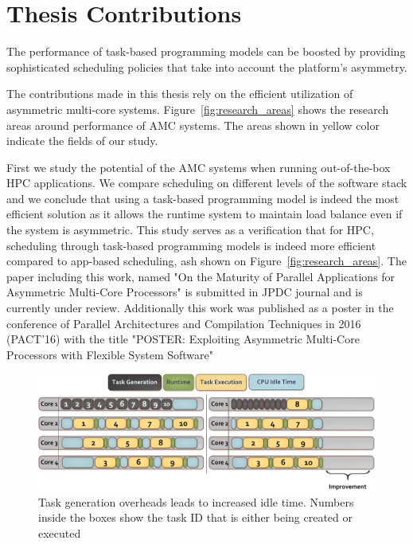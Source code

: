 \section{Thesis Contributions}




The performance of task-based programming models can be boosted by providing sophisticated scheduling policies that take into account the platform's asymmetry.

The contributions made in this thesis rely on the efficient utilization of asymmetric multi-core systems.
Figure~\ref{fig:research_areas} shows the research areas around performance of AMC systems.
The areas shown in yellow color indicate the fields of our study.

First we study the potential of the AMC systems when running out-of-the-box HPC applications.
We compare scheduling on different levels of the software stack and we conclude that using a task-based programming model is indeed the most efficient solution as it allows the runtime system to maintain load balance even if the system is asymmetric.
This study serves as a verification that for HPC, scheduling through task-based programming models is indeed more efficient compared to app-based scheduling, ash shown on Figure~\ref{fig:research_areas}.
The paper including this work, named "On the Maturity of Parallel Applications for Asymmetric Multi-Core Processors" is submitted in JPDC journal and is currently under review.
Additionally this work was published as a poster in the conference of Parallel Architectures and Compilation Techniques in 2016 (PACT'16) with the title "POSTER: Exploiting Asymmetric Multi-Core Processors with Flexible System Software"
\begin{figure}[t]%
	\centering
	\includegraphics[width=\textwidth]{figures/taskgenx_motivation.pdf}
	\caption{Task generation overheads leads to increased idle time. Numbers inside the boxes show the task ID that is either being created or executed}
	\label{fig:taskgenx_motivation}
\end{figure}

